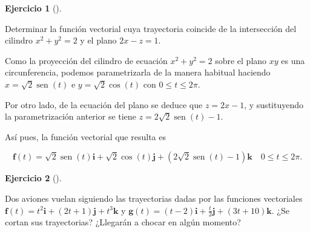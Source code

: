\documentclass[
  a4paper,
]{scrreport}
\theoremstyle{definition}
\newtheorem{exercise}{Ejercicio}[chapter]
\theoremstyle{remark}
\begin{document}
\begin{exercise}[]\protect\hypertarget{exr-trayectoria-interseccion-superficies}{}\label{exr-trayectoria-interseccion-superficies}

Determinar la función vectorial cuya trayectoria coincide de la
intersección del cilindro \(x^2+y^2=2\) y el plano \(2x-z=1\).

\end{exercise}

\begin{tcolorbox}[enhanced jigsaw, left=2mm, coltitle=black, colbacktitle=quarto-callout-tip-color!10!white, opacitybacktitle=0.6, colback=white, breakable, titlerule=0mm, toptitle=1mm, rightrule=.15mm, bottomtitle=1mm, bottomrule=.15mm, toprule=.15mm, leftrule=.75mm, arc=.35mm, opacityback=0, title=\textcolor{quarto-callout-tip-color}{\faLightbulb}\hspace{0.5em}{Solución}, colframe=quarto-callout-tip-color-frame]

Como la proyección del cilindro de ecuación \(x^2+y^2=2\) sobre el plano
\(xy\) es una circunferencia, podemos parametrizarla de la manera
habitual haciendo \(x=\sqrt{2}\operatorname{sen}(t)\) e
\(y=\sqrt{2}\cos(t)\) con \(0\leq t \leq 2\pi\).

Por otro lado, de la ecuación del plano se deduce que \(z = 2x-1\), y
sustituyendo la parametrización anterior se tiene
\(z = 2\sqrt{2}\operatorname{sen}(t)-1\).

Así pues, la función vectorial que resulta es

\[
\mathbf{f}(t) = \sqrt{2}\operatorname{sen}(t)\mathbf{i} + \sqrt{2}\cos(t)\mathbf{j} + (2\sqrt{2}\operatorname{sen}(t)-1)\mathbf{k} \quad 0\leq t \leq 2\pi.
\]

\end{tcolorbox}

\begin{exercise}[]\protect\hypertarget{exr-intersección-trayectorias}{}\label{exr-intersección-trayectorias}

Dos aviones vuelan siguiendo las trayectorias dadas por las funciones
vectoriales
\(\mathbf{f}(t)=t^2\mathbf{i}+(2t+1)\mathbf{j}+t^3\mathbf{k}\) y
\(\mathbf{g}(t)=(t-2)\mathbf{i}+\frac{t}{2}\mathbf{j}+(3t+10)\mathbf{k}\).
¿Se cortan sus trayectorias? ¿Llegarán a chocar en algún momento?

\end{exercise}
\end{document}
